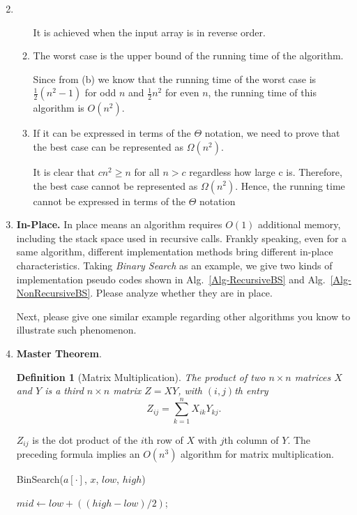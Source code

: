 \documentclass[12pt,a4paper]{article}
\makeatletter
\newtheorem*{solution}{Solution}
\newtheorem{definition}{Definition}
\theoremstyle{definition}
\renewenvironment{solution}[1][Solution] {\par\pushQED{\qed}\normalfont\topsep6\p@\@plus6\p@\relax\trivlist\item[\hskip\labelsep\bfseries#1\@addpunct{.}]\ignorespaces}{\popQED\endtrivlist\@endpefalse} \makeatother
\makeatother
\begin{document}
\begin{enumerate}
\begin{solution}
\begin{enumerate}
    It is achieved when the input array is in reverse order.
    \item The worst case is the upper bound of the running time of the algorithm. 
    
    Since from (b) we know that the running time of the worst case is $\frac{1}{2}(n^2-1)$ for odd $n$ and $\frac{1}{2}n^2$ for even $n$, the running time of this algorithm is $O(n^2)$.
    \item If it can be expressed in terms of the $\Theta$ notation, we need to prove that the best case can be represented as $\Omega(n^2)$.
    
    It is clear that $cn^2\geq n$ for all $n>c$ regardless how large c is. Therefore, the best case cannot be represented as $\Omega(n^2)$. Hence, the running time cannot be expressed in terms of the $\Theta$ notation
\end{enumerate}

\end{solution}

\item \textbf{In-Place.} In place means an algorithm requires $O(1)$ additional memory, including the stack space used in recursive calls. Frankly speaking, even for a same algorithm, different implementation methods bring different in-place characteristics. Taking \emph{Binary Search} as an example, we give two kinds of implementation pseudo codes shown in Alg.~\ref{Alg-RecursiveBS} and Alg.~\ref{Alg-NonRecursiveBS}. Please analyze whether they are in place.
    
    Next, please give one similar example regarding other algorithms you know to illustrate such phenomenon.

\item  \textbf{Master Theorem}.

\begin{definition}[Matrix Multiplication]
The product of two $n \times n$ matrices $X$ and $Y$ is a third $n \times n$ matrix $Z = XY$, with $(i,j)$th entry
$$Z_{ij}=\sum_{k=1}^{n}X_{ik}Y_{kj}.$$
\end{definition}
$Z_{ij}$ is the dot product of the $i$th row of $X$ with $j$th column of $Y$. The preceding formula implies an $O(n^3)$ algorithm for matrix multiplication.

\begin{minipage}[t]{0.49\textwidth}
\begin{algorithm}[H]
	\BlankLine
	\caption{BinSearch($a[\cdot]$, $x$, $low$, $high$)} \label{Alg-RecursiveBS}
	\BlankLine
    $mid \leftarrow low +((high - low) / 2)$;
    

\end{algorithm}
\end{minipage}
\end{enumerate}
\end{document}
